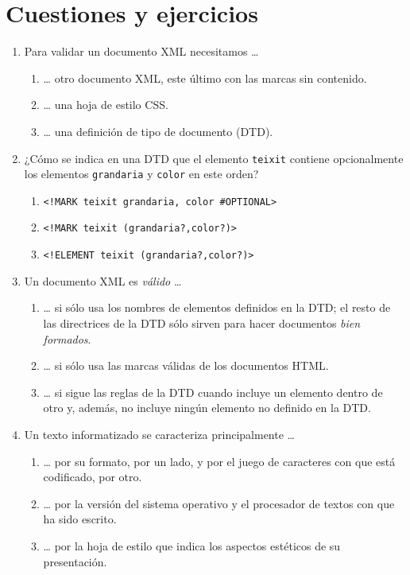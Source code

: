 \section{Cuestiones y ejercicios} \begin{enumerate} \item Para validar un documento XML necesitamos {\ldots} \begin{enumerate} \item {\ldots} otro documento XML, este último con las marcas sin contenido. \item {\ldots} una hoja de estilo CSS. \item {\ldots} una definición de tipo de documento (DTD). \end{enumerate} 

\item ¿Cómo se indica en una DTD que el elemento \texttt{teixit} contiene opcionalmente los elementos \texttt{grandaria} y  \texttt{color} en este orden? \begin{enumerate} \item \verb|<!MARK teixit grandaria, color #OPTIONAL>| \item \verb|<!MARK teixit (grandaria?,color?)>| \item \verb|<!ELEMENT teixit (grandaria?,color?)>| \end{enumerate} 

\item Un documento XML es \emph{válido} {\ldots} \begin{enumerate} \item {\ldots} si sólo usa los nombres de elementos definidos en la DTD; el resto de las directrices de la DTD sólo sirven para hacer documentos \emph{bien formados}. \item {\ldots} si sólo usa las marcas válidas de los documentos HTML. \item {\ldots} si sigue las reglas de la DTD cuando incluye un elemento dentro de otro y, además, no incluye ningún elemento no definido en la DTD. \end{enumerate} 

\item Un texto informatizado se caracteriza principalmente {\ldots} \begin{enumerate} \item {\ldots} por su formato, por un lado, y por el juego de caracteres con que está codificado, por otro. \item {\ldots} por la versión del sistema operativo y el procesador de textos con que ha sido escrito. \item {\ldots} por la hoja de estilo que indica los aspectos estéticos de su presentación. \end{enumerate} 


\end{enumerate}

